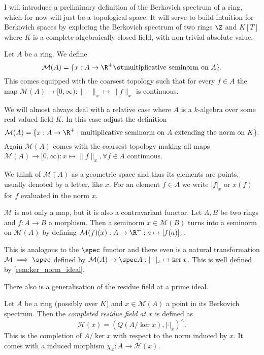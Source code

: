 I will introduce a preliminary definition of the Berkovich spectrum of a ring, which for now will just be a topological space. 
It will serve to build intuition for Berkovich spaces by exploring the Berkovich spectrum of two rings $\Z$ and $K[T]$ where $K$ is a complete algebraically closed field, with non-trivial absolute value. 

\begin{definition}
	Let $A$ be a ring. We define \[
		\mathcal{M} (A) = \{x: A \to \R^{+} \st \text{multiplicative seminorm on } A\} 
	.\] 
	This comes equipped with the coarsest topology such that for every $f \in A$ the map $\mathcal{M} (A) \to [0, \infty) : \|\cdot \|_x \mapsto \|f\|_x $ is continuous. 

	We will almost always deal with a relative case where $A$ is a $k$-algebra over some real valued field $K$. In this case adjust the definition \[
		\mathcal{M} (A) = \{x : A \to \R^{ + }  \mid \text{multiplicative seminorm on }A \text{ extending the norm on } K\} 
	.\] 
	Again $\mathcal{M} (A)$ comes with the coarsest topology making all maps $\mathcal{M} (A) \to [0, \infty): x \mapsto \|f\|_x, \forall f \in A$ continuous. 
\end{definition}
We think of $\mathcal{M} (A)$ as a geometric space and thus its elements are points, usually denoted by a letter, like $x$. 
For an element $f \in A$ we write $|f|_x$ or $x(f)$ for  $f$ evaluated in the norm $x$. 

\begin{remark}
	$\mathcal{M}$ is not only a map, but it is also a contravariant functor. 
	Let $A, B$ be two rings and $f: A \to B$ a morphism. 
	Then a seminorm $x \in \mathcal{M} (B)$ turns into a seminorm on $\mathcal{M} (A)$ by defining $\mathcal{M} (f)(x): A \to \R^{ +}: a \mapsto |f(a)|_x$.


This is analogous to the $\spec$ functor and there even is a natural transformation $\mathcal{M} \implies \spec$ defined by $\mathcal{M} (A) \to \spec A: |\cdot |_x \mapsto \ker x$. This is well defined by \cref{rem:ker_norm_ideal}. 
\end{remark}

There also is a generalisation of the residue field at a prime ideal. 

\begin{definition}\label{def:completed_residue_field}
	Let $A$ be a ring (possibly over $K$) and $x \in \mathcal{M} (A)$ a point in its Berkovich spectrum. 
	Then the \emph{completed residue field at $x$} is defined as \[
		\mathcal{H} (x) = (Q(A / \ker x), |\cdot |_x)^{\wedge}
	.\] 
	This is the completion of $A / \ker x$ with respect to the norm induced by $x$. 
	It comes with a induced morphism $\chi_x: A \to \mathcal{H} (x)$.
\end{definition}

